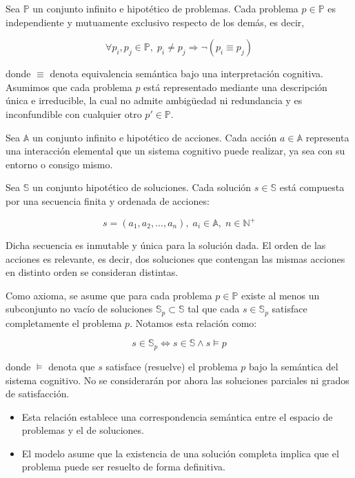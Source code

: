 Sea $\mathbb{P}$ un conjunto infinito e hipotético de problemas. Cada problema
$p \in \mathbb{P}$ es independiente y mutuamente exclusivo respecto de los
demás, es decir,

\begin{equation}
\forall p_i, p_j \in \mathbb{P}, \; p_i \ne p_j \Rightarrow \neg (p_i \equiv
p_j)
\end{equation}

donde $\equiv$ denota equivalencia semántica bajo una interpretación cognitiva.
Asumimos que cada problema $p$ está representado mediante una descripción única
e irreducible, la cual no admite ambigüedad ni redundancia y es inconfundible
con cualquier otro $p' \in \mathbb{P}$.

Sea $\mathbb{A}$ un conjunto infinito e hipotético de acciones. Cada acción $a
\in \mathbb{A}$ representa una interacción elemental que un sistema cognitivo
puede realizar, ya sea con su entorno o consigo mismo.

Sea $\mathbb{S}$ un conjunto hipotético de soluciones. Cada solución $s \in
\mathbb{S}$ está compuesta por una secuencia finita y ordenada de acciones:

\begin{equation}
s = (a_1, a_2, \dots, a_n), \; a_i \in \mathbb{A}, \; n \in \mathbb{N}^+
\end{equation}

Dicha secuencia es inmutable y única para la solución dada. El orden de las
acciones es relevante, es decir, dos soluciones que contengan las mismas
acciones en distinto orden se consideran distintas.

Como axioma, se asume que para cada problema $p \in \mathbb{P}$ existe al menos un subconjunto no vacío de
soluciones $\mathbb{S}_p \subset \mathbb{S}$ tal que cada $s \in \mathbb{S}_p$
satisface completamente el problema $p$. Notamos esta relación como:

\begin{equation}
 s \in \mathbb{S} _p \iff s \in \mathbb{S} \land s \models p
\end{equation}

donde $\models$ denota que $s$ satisface (resuelve) el problema $p$ bajo la
semántica del sistema cognitivo. No se considerarán por ahora las
soluciones parciales ni grados de satisfacción.

\begin{itemize}
 \item Esta relación establece una correspondencia semántica
entre el espacio de problemas y el de soluciones.
 \item El modelo asume que la
existencia de una solución completa implica que el problema puede ser resuelto de
forma definitiva.
 \end{itemize}

